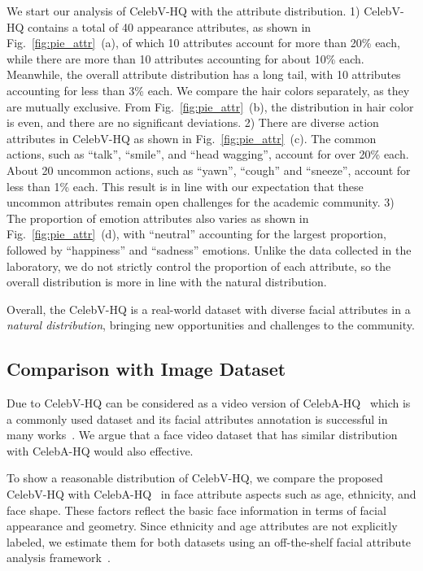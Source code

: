 We start our analysis of CelebV-HQ with the attribute distribution. 1) CelebV-HQ contains a total of 40 appearance attributes, as shown in Fig.~\ref{fig:pie_attr}~(a), of which 10 attributes account for more than 20\% each, while there are more than 10 attributes accounting for about 10\% each. Meanwhile, the overall attribute distribution has a long tail, with 10 attributes accounting for less than 3\% each. We compare the hair colors separately, as they are mutually exclusive. From Fig.~\ref{fig:pie_attr}~(b), the distribution in hair color is even, and there are no significant deviations. 2) There are diverse action attributes in CelebV-HQ as shown in Fig.~\ref{fig:pie_attr}~(c). The common actions, such as ``talk'', ``smile'', and ``head wagging'', account for over 20\% each. About 20 uncommon actions, such as ``yawn'', ``cough'' and ``sneeze'', account for less than 1\% each. This result is in line with our expectation that these uncommon attributes remain open challenges for the academic community. 3) The proportion of emotion attributes also varies as shown in Fig.~\ref{fig:pie_attr}~(d), with ``neutral'' accounting for the largest proportion, followed by ``happiness'' and ``sadness'' emotions. Unlike the data collected in the laboratory, we do not strictly control the proportion of each attribute, so the overall distribution is more in line with the natural distribution. 

Overall, the CelebV-HQ is a real-world dataset with diverse facial attributes in a \textit{natural distribution}, bringing new opportunities and challenges to the community.

\subsection{Comparison with Image Dataset}

Due to CelebV-HQ can be considered as a video version of CelebA-HQ~\cite{celebahq} which is a commonly used dataset and its facial attributes annotation is successful in many works~\cite{shen2017learning,e4e,Yao_2021_ICCV,han2017heterogeneous,ding2018deep,stylegan,stylegan2,starganv2}. We argue that a face video dataset that has similar distribution with CelebA-HQ would also effective. 

To show a reasonable distribution of CelebV-HQ, we compare the proposed CelebV-HQ with CelebA-HQ~\cite{celebahq} in face attribute aspects such as age, ethnicity, and face shape. These factors reflect the basic face information in terms of facial appearance and geometry. Since ethnicity and age attributes are not explicitly labeled, we estimate them for both datasets using an off-the-shelf facial attribute analysis framework~\cite{serengil2021lightface}.

